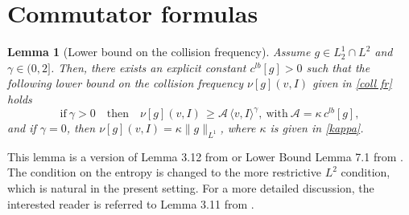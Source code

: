 \documentclass[11pt,a4paper]{amsart}
\newcommand{\g}{\gamma}
\newcommand{\la}{\langle}
\newcommand{\ra}{\rangle}
\newcommand{\mAg}{\mathcal{A}}
\newtheorem{lemma}[theorem]{Lemma}
\begin{document}
 

\section{Commutator formulas}


\begin{lemma}[Lower bound on the collision frequency] \label{Prop: coll freq} Assume $g \in L^1_{2} \cap L^2$ and $\g \in(0,2]$. Then, there exists an explicit  constant ${c}^{lb}[g]  > 0$   such that the following lower bound on the collision frequency  $	\nu[g](v,I) $ given in \eqref{coll fr}  holds
	\begin{equation}\label{coll freq lower est}
		\text{if} \ \g >0 \quad \text{then} \quad \nu[g](v,I) \,   \geq \mAg \, \la v, I \ra^{\g}, \ \text{with} \  \mAg =\kappa \, c^{lb}[g], %
	\end{equation} 
	and if $\g=0$, then  $ \nu[g](v,I) =  \kappa  \| g \|_{L^1}$, 
	where $\kappa$ is given in \eqref{kappa}.   
\end{lemma}
This lemma is a version of Lemma 3.12 from \cite{MC-Alonso-Pesaro} or Lower Bound Lemma 7.1 from \cite{MC-Alonso-Lp}. The condition on the entropy is changed to the  more restrictive $L^2$ condition, which is   natural   in the present setting.  For a more detailed discussion, the interested reader is  referred  to    Lemma 3.11 from \cite{MC-Alonso-Pesaro}.
\end{document}
